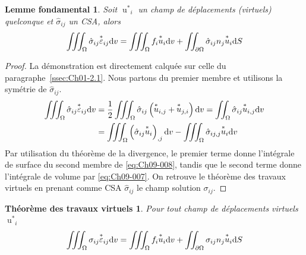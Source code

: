 \newtheorem*{lfond}{Lemme fondamental}
\begin{lfond}
    Soit ${\mathop{u}^{\ast}}_i$ un champ de déplacements (virtuels) quelconque et $\hat{\sigma}_{ij}$ un CSA, alors
    \begin{equation}
        \iiint_{\Omega} \hat{\sigma}_{ij} {\mathop{\varepsilon}^{\ast}}_{ij} \mathrm{d} v = \iiint_{\Omega} f_{i} {\mathop{u}^{\ast}}_i \mathrm{d} v + \iint_{\partial \Omega} \hat{\sigma}_{ij} n_j {\mathop{u}^{\ast}}_i \mathrm{d} S
        \label{eq:Ch09-008}
    \end{equation}
\end{lfond}
\begin{proof}
    La  démonstration  est directement calquée sur celle du paragraphe~\ref{ssec:Ch01-2.1}.
    Nous partons du premier membre et utilisons la symétrie de $\hat{\sigma}_{ij}$.
    \begin{align*}
        \iiint_{\Omega} \hat{\sigma}_{ij} {\mathop{\varepsilon}^{\ast}}_{ij} \mathrm{d} v &= \frac{1}{2} \iiint_{\Omega} \hat{\sigma}_{ij} \left( {\mathop{u}^{\ast}}_{i,j} + {\mathop{u}^{\ast}}_{j,i}  \right) \mathrm{d} v = \iint_{\Omega} \hat{\sigma}_{ij} {\mathop{u}^{\ast}}_{i,j} \mathrm{d} v \\
        & = \iiint_{\Omega} \left( \hat{\sigma}_{ij} {\mathop{u}^{\ast}}_{i} \right)_{,j} \mathrm{d} v - \iiint_{\Omega} \hat{\sigma}_{ij,j}  {\mathop{u}^{\ast}}_{i} \mathrm{d} v
    \end{align*}
    Par utilisation du théorème de la divergence, le premier terme donne l'intégrale de surface du second membre de \eqref{eq:Ch09-008}, tandis que le second terme donne l'intégrale de volume par \eqref{eq:Ch09-007}.
    On retrouve le théorème des travaux virtuels en prenant comme CSA $\hat{\sigma}_{ij}$ le champ solution $\sigma_{ij}$.
\end{proof}

\newtheorem*{ttv}{Théorème des travaux virtuels}
\begin{ttv}
    Pour tout champ de déplacements virtuels ${\mathop{u}^{\ast}}_{i}$
    \begin{equation}
        \iiint_{\Omega} \sigma_{ij} {\mathop{\varepsilon}^{\ast}}_{ij} \mathrm{d} v = \iiint_{\Omega} f_i {\mathop{u}^{\ast}}_i \mathrm{d} v + \iint_{\partial \Omega} \sigma_{ij} n_j {\mathop{u}^{\ast}}_i \mathrm{d} S
        \label{eq:Ch09-009}
    \end{equation}
\end{ttv}

